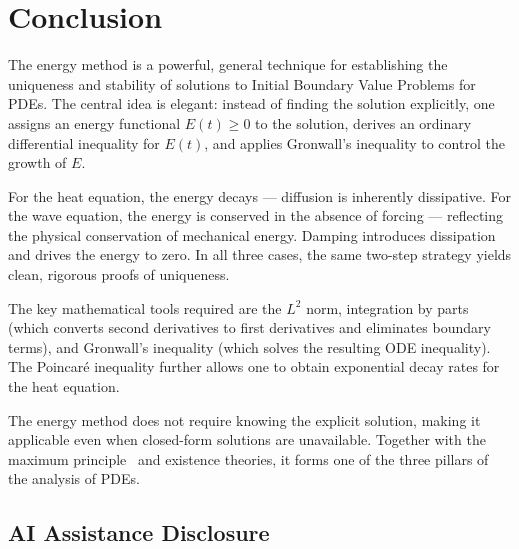 \documentclass[12pt,a4paper]{article}
\theoremstyle{plain}
\theoremstyle{definition}
\begin{document}
\section{Conclusion}
\label{sec:conclusion}

The energy method is a powerful, general technique for establishing the
uniqueness and stability of solutions to Initial Boundary Value Problems for
PDEs. The central idea is elegant: instead of finding the solution explicitly,
one assigns an energy functional $E(t)\geq 0$ to the solution, derives an
ordinary differential inequality for $E(t)$, and applies Gronwall's inequality
to control the growth of $E$.

For the heat equation, the energy decays — diffusion is inherently dissipative.
For the wave equation, the energy is conserved in the absence of forcing —
reflecting the physical conservation of mechanical energy. Damping introduces
dissipation and drives the energy to zero. In all three cases, the same
two-step strategy yields clean, rigorous proofs of uniqueness.

The key mathematical tools required are the $L^2$ norm, integration by parts
(which converts second derivatives to first derivatives and eliminates boundary
terms), and Gronwall's inequality (which solves the resulting ODE inequality).
The Poincar\'{e} inequality further allows one to obtain exponential decay rates
for the heat equation.

The energy method does not require knowing the explicit solution, making it
applicable even when closed-form solutions are unavailable. Together with the
maximum principle~\cite{Protter} and existence theories, it forms one of the three pillars of
the analysis of PDEs.

\subsection*{AI Assistance Disclosure}
\end{document}
